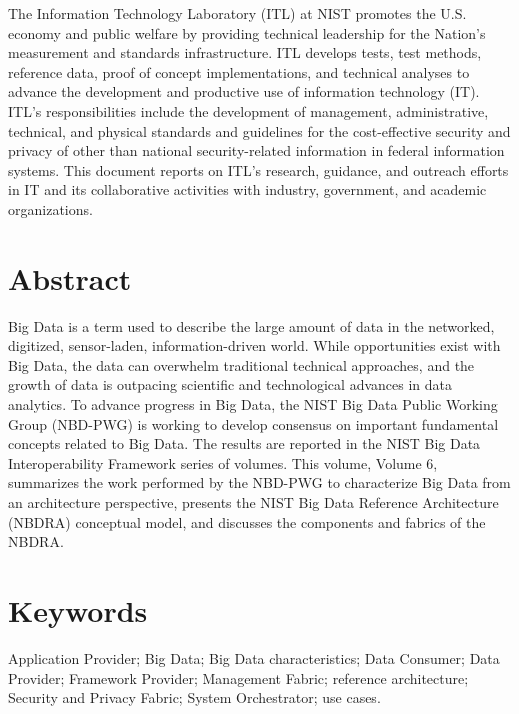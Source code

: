 \documentclass[11pt]{article}
\begin{document}
The Information Technology Laboratory (ITL) at NIST promotes the U.S. economy and public welfare by 
providing technical leadership for the Nation’s measurement and standards infrastructure. ITL develops 
tests, test methods, reference data, proof of concept implementations, and technical analyses to advance 
the development and productive use of information technology (IT). ITL’s responsibilities include the 
development of management, administrative, technical, and physical standards and guidelines for the 
cost-effective security and privacy of other than national security-related information in federal 
information systems. This document reports on ITL’s research, guidance, and outreach efforts in IT and 
its collaborative activities with industry, government, and academic organizations.

\section*{Abstract}

Big Data is a term used to describe the large amount of data in the networked, digitized, sensor-laden, 
information-driven world. While opportunities exist with Big Data, the data can overwhelm traditional 
technical approaches, and the growth of data is outpacing scientific and technological advances in data 
analytics. To advance progress in Big Data, the NIST Big Data Public Working Group (NBD-PWG) is 
working to develop consensus on important fundamental concepts related to Big Data. The results are 
reported in the NIST Big Data Interoperability Framework series of volumes. This volume, Volume 6, 
summarizes the work performed by the NBD-PWG to characterize Big Data from an architecture 
perspective, presents the NIST Big Data Reference Architecture (NBDRA) conceptual model, and 
discusses the components and fabrics of the NBDRA. 



\section*{Keywords}

Application Provider; Big Data; Big Data characteristics; Data Consumer; Data Provider; Framework 
Provider; Management Fabric; reference architecture; Security and Privacy Fabric; System Orchestrator; 
use cases. 
\end{document}
